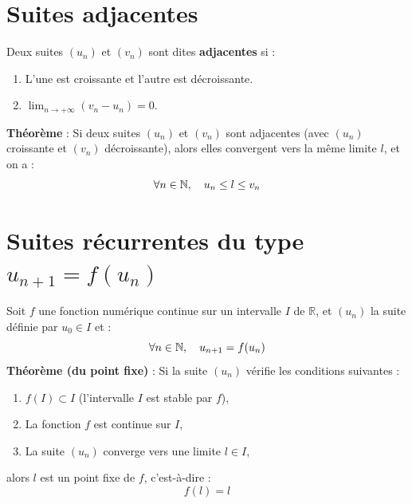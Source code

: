 \documentclass{article}
\begin{document}
	\section{Suites adjacentes}
	Deux suites $(u_n)$ et $(v_n)$ sont dites \textbf{adjacentes} si :
	\begin{enumerate}
		\item L'une est croissante et l'autre est décroissante.
		\item $\lim_{n \to +\infty} (v_n - u_n) = 0$.
	\end{enumerate}
	\textbf{Théorème} : Si deux suites $(u_n)$ et $(v_n)$ sont adjacentes (avec $(u_n)$ croissante et $(v_n)$ décroissante), alors elles convergent vers la même limite $l$, et on a :
	\[ \qcq{n}{N}, \quad u_n \le l \le v_n \]
	
	\section{Suites récurrentes du type $u_{n+1} = f(u_n)$}
	Soit $f$ une fonction numérique continue sur un intervalle $I$ de $\mathbb{R}$, et $(u_n)$ la suite définie par $u_0 \in I$ et :
	\[ \qcq{n}{N}, \quad u_{n+1} = f(u_n) \]
	\textbf{Théorème (du point fixe)} :
	Si la suite $(u_n)$ vérifie les conditions suivantes :
	\begin{enumerate}
		\item $f(I) \subset I$ (l'intervalle $I$ est stable par $f$),
		\item La fonction $f$ est continue sur $I$,
		\item La suite $(u_n)$ converge vers une limite $l \in I$,
	\end{enumerate}
	alors $l$ est un point fixe de $f$, c'est-à-dire :
	\[ f(l) = l \]
	
\end{document}
